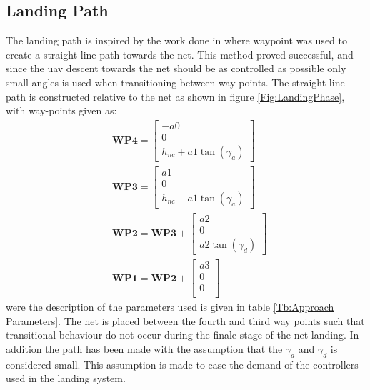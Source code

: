 \subsection{Landing Path}\label{SS:netApproach}
The landing path is inspired by the work done in \citep{Skulstad&Syversen} where waypoint was used to create a straight line path towards the net. This method proved successful, and since the \gls{uav} descent towards the net should be as controlled as possible only small angles is used when transitioning between way-points. The straight line path is constructed relative to the net as shown in figure \ref{Fig:LandingPhase}, with way-points given as:
\begin{subequations}
\begin{align}
&\mathbf{WP4} = 
\begin{bmatrix}
-a0 \\
0 \\
h_{nc} + a1\tan(\gamma_a) 
\end{bmatrix}\\
&\mathbf{WP3} = 
\begin{bmatrix}
a1 \\
0 \\
h_{nc} - a1\tan(\gamma_a)
\end{bmatrix}\\
&\mathbf{WP2} = \mathbf{WP3} + 
\begin{bmatrix}
a2 \\
0 \\
a2\tan(\gamma_d)
\end{bmatrix}\\
&\mathbf{WP1} = \mathbf{WP2} + 
\begin{bmatrix}
a3 \\
0 \\
0 \\
\end{bmatrix}
\end{align}
\end{subequations}
were the description of the parameters used is given in table \ref{Tb:Approach Parameters}. The net is placed between the fourth and third way points such that transitional behaviour do not occur during the finale stage of the net landing. In addition the path has been made with the assumption that the $\gamma_a$ and $\gamma_d$ is considered small. This assumption is made to ease the demand of the controllers used in the landing system.
